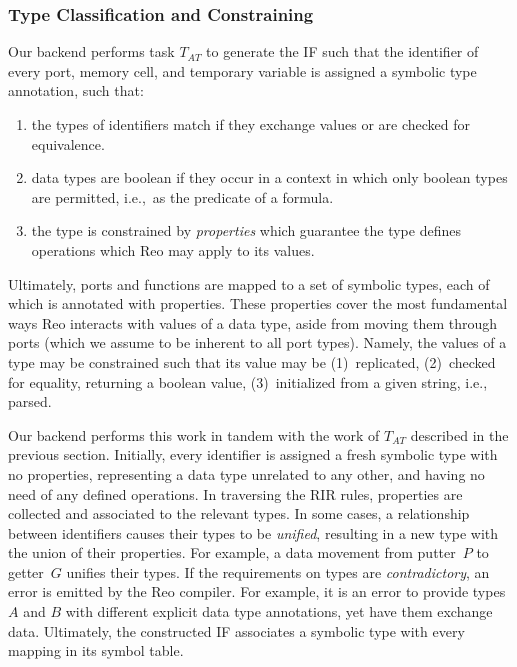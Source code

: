 \subsubsection{Type Classification and Constraining}
Our backend performs task $T_{AT}$ to generate the IF such that the identifier of every port, memory cell, and temporary variable is assigned a symbolic type annotation, such that:
\begin{enumerate}
	\item the types of identifiers match if they exchange values or are checked for equivalence.
	\item data types are boolean if they occur in a context in which only boolean types are permitted, i.e.,\ as the predicate of a formula.
	\item the type is constrained by \textit{properties} which guarantee the type defines operations which Reo may apply to its values. 
\end{enumerate}

Ultimately, ports and functions are mapped to a set of symbolic types, each of which is annotated with properties. These properties cover the most fundamental ways Reo interacts with values of a data type, aside from moving them through ports (which we assume to be inherent to all port types). Namely, the values of a type may be constrained such that its value may be (1)~replicated, (2)~checked for equality, returning a boolean value, (3)~initialized from a given string, i.e., parsed.

Our backend performs this work in tandem with the work of $T_{AT}$ described in the previous section. Initially, every identifier is assigned a fresh symbolic type with no properties, representing a data type unrelated to any other, and having no need of any defined operations. In traversing the RIR rules, properties are collected and associated to the relevant types. In some cases, a relationship between identifiers causes their types to be \textit{unified}, resulting in a new type with the union of their properties. For example, a data movement from putter~$P$ to getter~$G$ unifies their types. If the requirements on types are \textit{contradictory}, an error is emitted by the Reo compiler. For example, it is an error to provide types $A$ and $B$ with different explicit data type annotations, yet have them exchange data.
Ultimately, the constructed IF associates a symbolic type with every mapping in its symbol table.

